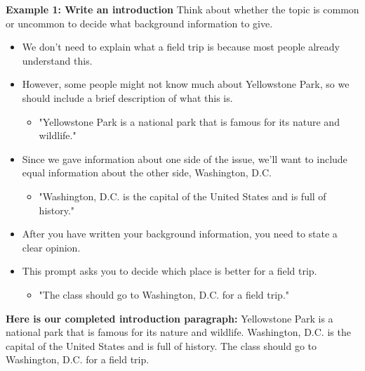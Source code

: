 \documentclass[12pt]{article}
\begin{document}
\vspace{1em}
\begin{tcolorbox}[colframe=black!60, colback=white, 
coltitle=black, colbacktitle=black!15, fonttitle=\bfseries\Large, 
title=Examples, halign title=center, left=10pt, right=10pt, top=10pt, bottom=15pt]

\textbf{Example 1: Write an introduction}
Think about whether the topic is common or uncommon to decide what background information to give.
    \begin{itemize}
        \item We don't need to explain what a field trip is because most people already understand this.
        \item However, some people might not know much about Yellowstone Park, so we should include a brief description of what this is. 
        \begin{itemize}
            \item "Yellowstone Park is a national park that is famous for its nature and wildlife."
        \end{itemize}
        \item Since we gave information about one side of the issue, we'll want to include equal information about the other side, Washington, D.C.
        \begin{itemize}
            \item "Washington, D.C. is the capital of the United States and is full of history."
        \end{itemize}
    \end{itemize}
\begin{itemize}
    \item After you have written your background information, you need to state a clear opinion.
\end{itemize}
\begin{itemize}
    \item This prompt asks you to decide which place is better for a field trip.
    \begin{itemize}
        \item "The class should go to Washington, D.C. for a field trip."
    \end{itemize}
\end{itemize}


\textbf{Here is  our completed introduction paragraph:} Yellowstone Park is a national park that is famous for its nature and wildlife. Washington, D.C. is the capital of the United States and is full of history. The class should go to Washington, D.C. for a field trip.







     \end{tcolorbox}
\end{document}
